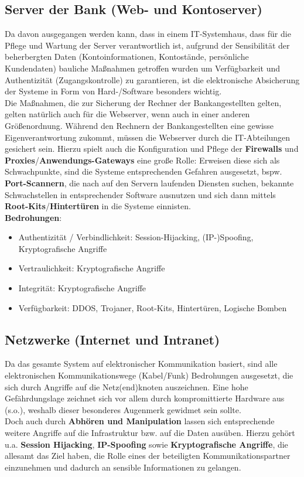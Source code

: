 \subsection{Server der Bank (Web- und Kontoserver)}
Da davon ausgegangen werden kann, dass in einem IT-Systemhaus, dass für die Pflege und Wartung der Server verantwortlich ist, aufgrund der Sensibilität der beherbergten Daten (Kontoinformationen, Kontostände, persönliche Kundendaten) bauliche Maßnahmen getroffen wurden um Verfügbarkeit und Authentizität (Zugangskontrolle) zu garantieren, ist die elektronische Absicherung der Systeme in Form von Hard-/Software besonders wichtig.\\
Die Maßnahmen, die zur Sicherung der Rechner der Bankangestellten gelten, gelten natürlich auch für die Webserver, wenn auch in einer anderen Größenordnung. Während den Rechnern der Bankangestellten eine gewisse Eigenverantwortung zukommt, müssen die Webserver durch die IT-Abteilungen gesichert sein. Hierzu spielt auch die Konfiguration und Pflege der \textbf{Firewalls} und \textbf{Proxies}/\textbf{Anwendungs-Gateways} eine große Rolle: Erweisen diese sich als Schwachpunkte, sind die Systeme entsprechenden Gefahren ausgesetzt, bspw. \textbf{Port-Scannern}, die nach auf den Servern laufenden Diensten suchen, bekannte Schwachstellen in entsprechender Software ausnutzen und sich dann mittels \textbf{Root-Kits}/\textbf{Hintertüren} in die Systeme einnisten.\\


\noindent
\textbf{Bedrohungen}:
\begin{itemize}
    \itemsep0.5em
    \item Authentizität / Verbindlichkeit: Session-Hijacking, (IP-)Spoofing, Kryptografische Angriffe
    \item Vertraulichkeit: Kryptografische Angriffe
    \item Integrität: Kryptografische Angriffe
    \item Verfügbarkeit: DDOS, Trojaner, Root-Kits, Hintertüren, Logische Bomben
\end{itemize}


\subsection{Netzwerke (Internet und Intranet)}
Da das gesamte System auf elektronischer Kommunikation basiert, sind alle elektronischen Kommunikationswege (Kabel/Funk) Bedrohungen ausgesetzt, die sich durch Angriffe auf die Netz(end)knoten auszeichnen. Eine hohe Gefährdungslage zeichnet sich vor allem durch kompromittierte Hardware aus (s.o.), weshalb dieser besonderes Augenmerk gewidmet sein sollte.\\
Doch auch durch \textbf{Abhören und Manipulation} lassen sich entsprechende weitere Angriffe auf die Infrastruktur bzw. auf die Daten ausüben. Hierzu gehört u.a. \textbf{Session Hijacking}, \textbf{IP-Spoofing} sowie \textbf{Kryptografische Angriffe}, die allesamt das Ziel haben, die Rolle eines der beteiligten Kommunikationspartner einzunehmen und dadurch an sensible Informationen zu gelangen.\\


